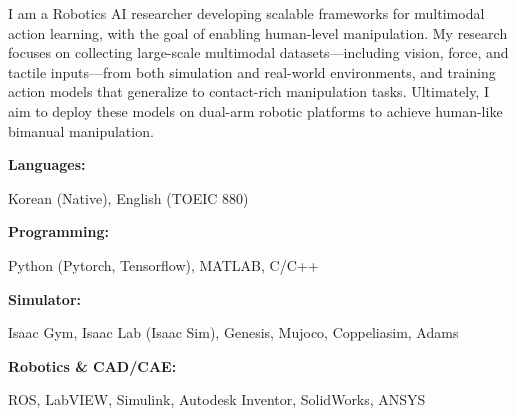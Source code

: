 \documentclass[9pt]{developercv} %
\begin{document}
\begin{minipage}[t]{0.46\textwidth}
	\vspace{-6pt}
 
	I am a Robotics AI researcher developing scalable frameworks for multimodal action learning, with the goal of enabling human-level manipulation. My research focuses on collecting large-scale multimodal datasets—including vision, force, and tactile inputs—from both simulation and real-world environments, and training action models that generalize to contact-rich manipulation tasks. Ultimately, I aim to deploy these models on dual-arm robotic platforms to achieve human-like bimanual manipulation. \\


 
\end{minipage}
\hfill %
\begin{minipage}[t]{0.465\textwidth}
    \vspace{-6pt}
    
    \begin{minipage}[t]{0.2\textwidth}
        \textbf{Languages:}
    \end{minipage}
    \hfill
    \begin{minipage}[t]{0.73\textwidth}
        Korean (Native), English (TOEIC 880)
    \end{minipage}
    \vspace{4mm}
    
    \begin{minipage}[t]{0.2\textwidth}
        \textbf{Programming:}
    \end{minipage}
    \hfill
    \begin{minipage}[t]{0.73\textwidth}
      Python (Pytorch, Tensorflow), MATLAB, C/C++
    \end{minipage}
    \vspace{4mm}

    \begin{minipage}[t]{0.2\textwidth}
        \textbf{Simulator:}
    \end{minipage}
    \hfill
    \begin{minipage}[t]{0.73\textwidth}
      Isaac Gym, Isaac Lab (Isaac Sim), Genesis, Mujoco, Coppeliasim, Adams
    \end{minipage}
    \vspace{4mm}

    \begin{minipage}[t]{0.2\textwidth}
      \textbf{Robotics \& CAD/CAE:}
    \end{minipage}
    \hfill
    \begin{minipage}[t]{0.73\textwidth}
      ROS, LabVIEW, Simulink, Autodesk Inventor, SolidWorks, ANSYS
    \end{minipage}
    
\end{minipage}
\end{document}
